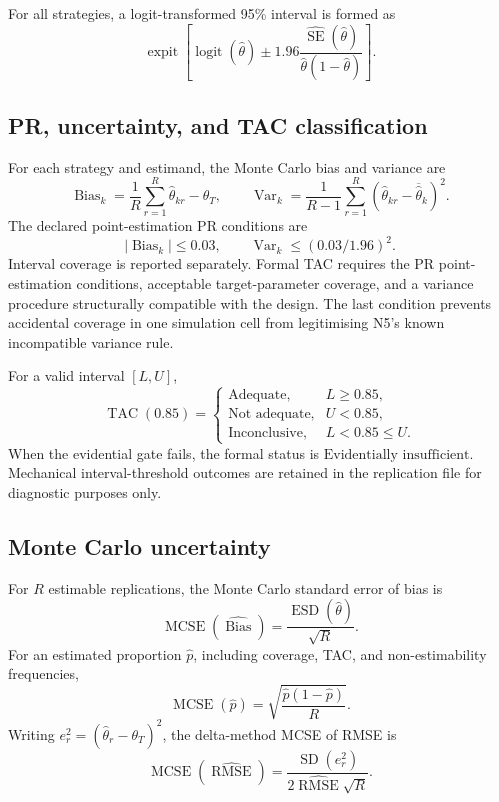 For all strategies, a logit-transformed 95\% interval is formed as
\[
  \operatorname{expit}\left[
    \operatorname{logit}(\widehat\theta)
    \pm
    1.96\frac{\widehat{\operatorname{SE}}(\widehat\theta)}
                    {\widehat\theta(1-\widehat\theta)}
  \right].
\]

\subsection{PR, uncertainty, and TAC classification}

For each strategy and estimand, the Monte Carlo bias and variance are
\[
  \operatorname{Bias}_k
  =
  \frac{1}{R}\sum_{r=1}^R\widehat\theta_{kr}-\theta_T,
  \qquad
  \operatorname{Var}_k
  =
  \frac{1}{R-1}\sum_{r=1}^R
  (\widehat\theta_{kr}-\overline{\widehat\theta}_k)^2.
\]
The declared point-estimation PR conditions are
\[
  |\operatorname{Bias}_k|\leq0.03,
  \qquad
  \operatorname{Var}_k\leq(0.03/1.96)^2.
\]
Interval coverage is reported separately. Formal TAC requires the PR
point-estimation conditions, acceptable target-parameter coverage, and a
variance procedure structurally compatible with the design. The last condition
prevents accidental coverage in one simulation cell from legitimising N5's
known incompatible variance rule.

For a valid interval \([L,U]\),
\[
  \operatorname{TAC}(0.85)
  =
  \begin{cases}
    \text{Adequate}, & L\geq0.85,\\
    \text{Not adequate}, & U<0.85,\\
    \text{Inconclusive}, & L<0.85\leq U.
  \end{cases}
\]
When the evidential gate fails, the formal status is
\(\text{Evidentially insufficient}\). Mechanical interval-threshold outcomes
are retained in the replication file for diagnostic purposes only.

\subsection{Monte Carlo uncertainty}

For \(R\) estimable replications, the Monte Carlo standard error of bias is
\[
  \operatorname{MCSE}(\widehat{\operatorname{Bias}})
  =
  \frac{\operatorname{ESD}(\widehat\theta)}{\sqrt R}.
\]
For an estimated proportion \(\widehat p\), including coverage, TAC, and
non-estimability frequencies,
\[
  \operatorname{MCSE}(\widehat p)
  =
  \sqrt{\frac{\widehat p(1-\widehat p)}{R}}.
\]
Writing \(e_r^2=(\widehat\theta_r-\theta_T)^2\), the delta-method MCSE of RMSE
is
\[
  \operatorname{MCSE}(\widehat{\operatorname{RMSE}})
  =
  \frac{\operatorname{SD}(e_r^2)}
       {2\widehat{\operatorname{RMSE}}\sqrt R}.
\]

